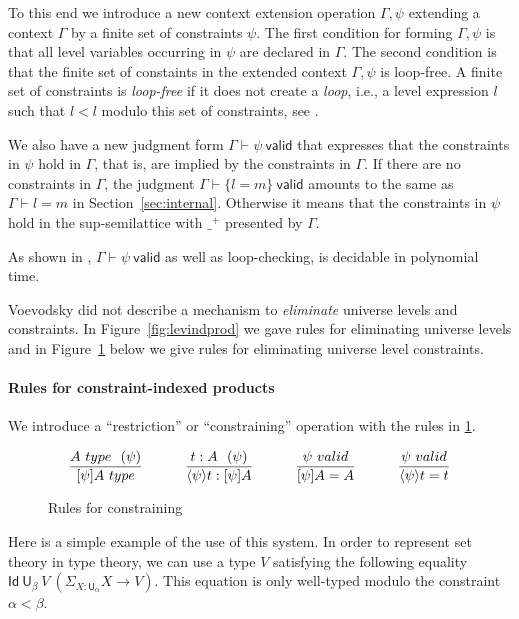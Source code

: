 \documentclass[a4paper,UKenglish,cleveref, autoref, thm-restate]{lipics-v2021}
\newcommand{\Id}{\mathsf{Id}}
\newcommand{\UU}{\mathsf{U}}
\newcommand{\valid}{\mathsf{valid}}
\newcommand{\type}{\mathsf{type}}
\newcommand{\lam}[1]{{\langle}#1{\rangle}}
\newcommand{\set}[1]{\{#1\}}
\begin{document}
To this end we introduce a new context extension operation $\Gamma,\psi$
extending a context $\Gamma$ by a finite set of constraints $\psi$.
The first condition for forming $\Gamma,\psi$ is that all level variables
occurring in $\psi$ are declared in $\Gamma$. The second condition
is that the finite set of constaints in the extended context
$\Gamma,\psi$ is loop-free.
A finite set of constraints is {\em loop-free} if it does not
create a {\em loop}, i.e., a level expression $l$ such that $l<l$
modulo this set of constraints, see \cite{bezem-coquand:lattices}.

We also have a new judgment form $\Gamma\vdash\psi~\valid$ that expresses
that the constraints in $\psi$ hold in $\Gamma$, that is,
are implied by the constraints in $\Gamma$. If there are
no constraints in $\Gamma$, the judgment $\Gamma\vdash\set{l=m}~\valid$
amounts to the same as $\Gamma\vdash l=m$ in Section~\ref{sec:internal}.
Otherwise it means that the constraints in $\psi$ hold in the
sup-semilattice with $\_^+$ presented by $\Gamma$.

As shown in \cite{bezem-coquand:lattices}, $\Gamma\vdash\psi~\valid$
as well as loop-checking, is decidable in polynomial time.


Voevodsky \cite {VV} did not describe a mechanism to {\em eliminate}
universe levels and constraints. In Figure~\ref{fig:levindprod} we
gave rules for eliminating universe levels
and in Figure~\ref{fig:restriction} below we give rules
for eliminating universe level constraints.

\paragraph*{Rules for constraint-indexed products}
We introduce a ``restriction'' or ``constraining'' operation with
the rules in \cref{fig:restriction}.
\begin{figure}[h!]
$$
\frac{A~\type~~(\psi)}{[\psi]A~\type}~~~~~~~~~
\frac{{t}:A~~(\psi)}{\lam{\psi}{t}:[\psi]A}~~~~~~~~~
\frac{\psi~\valid}{[\psi]A = A}~~~~~~~~~
\frac{\psi~\valid}{\lam{\psi}{t} = t}
\belowdisplayshortskip 1pt
$$
 \caption{Rules for constraining}%
  \label{fig:restriction}
\end{figure}


Here is a simple example of the use of this system.
In order to represent set theory in type
theory, we can use a type $V$ satisfying the following equality $\Id~{\UU_{\beta}}~V~(\Sigma_{X:\UU_{\alpha}}X\rightarrow V)$.
This equation is only well-typed modulo the constraint $\alpha<\beta$.
\end{document}
